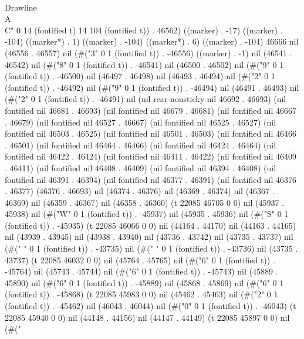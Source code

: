    \\Drawline{\\A\\C}" 0 14 (fontified t) 14 104 (fontified t)) . 46562) ((marker) . -17) ((marker) . -104) ((marker*) . 1) ((marker) . -104) ((marker*) . 6) ((marker) . -104) 46666 nil (46556 . 46557) nil (#("3" 0 1 (fontified t)) . -46556) ((marker) . -1) nil (46541 . 46542) nil (#("8" 0 1 (fontified t)) . -46541) nil (46500 . 46502) nil (#("9" 0 1 (fontified t)) . -46500) nil (46497 . 46498) nil (46493 . 46494) nil (#("2" 0 1 (fontified t)) . -46492) nil (#("9" 0 1 (fontified t)) . -46494) nil (46491 . 46493) nil (#("2" 0 1 (fontified t)) . -46491) nil (nil rear-nonsticky nil 46692 . 46693) (nil fontified nil 46681 . 46693) (nil fontified nil 46679 . 46681) (nil fontified nil 46667 . 46679) (nil fontified nil 46527 . 46667) (nil fontified nil 46525 . 46527) (nil fontified nil 46503 . 46525) (nil fontified nil 46501 . 46503) (nil fontified nil 46466 . 46501) (nil fontified nil 46464 . 46466) (nil fontified nil 46424 . 46464) (nil fontified nil 46422 . 46424) (nil fontified nil 46411 . 46422) (nil fontified nil 46409 . 46411) (nil fontified nil 46408 . 46409) (nil fontified nil 46394 . 46408) (nil fontified nil 46391 . 46394) (nil fontified nil 46377 . 46391) (nil fontified nil 46376 . 46377) (46376 . 46693) nil (46374 . 46376) nil (46369 . 46374) nil (46367 . 46369) nil (46359 . 46367) nil (46358 . 46360) (t 22085 46705 0 0) nil (45937 . 45938) nil (#("W" 0 1 (fontified t)) . -45937) nil (45935 . 45936) nil (#("S" 0 1 (fontified t)) . -45935) (t 22085 46066 0 0) nil (44164 . 44170) nil (44163 . 44165) nil (43939 . 43945) nil (43938 . 43940) nil (43736 . 43742) nil (43735 . 43737) nil (#(" " 0 1 (fontified t)) . -43735) nil (#(" " 0 1 (fontified t)) . -43736) nil (43735 . 43737) (t 22085 46032 0 0) nil (45764 . 45765) nil (#("6" 0 1 (fontified t)) . -45764) nil (45743 . 45744) nil (#("6" 0 1 (fontified t)) . -45743) nil (45889 . 45890) nil (#("6" 0 1 (fontified t)) . -45889) nil (45868 . 45869) nil (#("6" 0 1 (fontified t)) . -45868) (t 22085 45983 0 0) nil (45462 . 45463) nil (#("2" 0 1 (fontified t)) . -45462) nil (46043 . 46044) nil (#("0" 0 1 (fontified t)) . -46043) (t 22085 45940 0 0) nil (44148 . 44156) nil (44147 . 44149) (t 22085 45897 0 0) nil (#("
